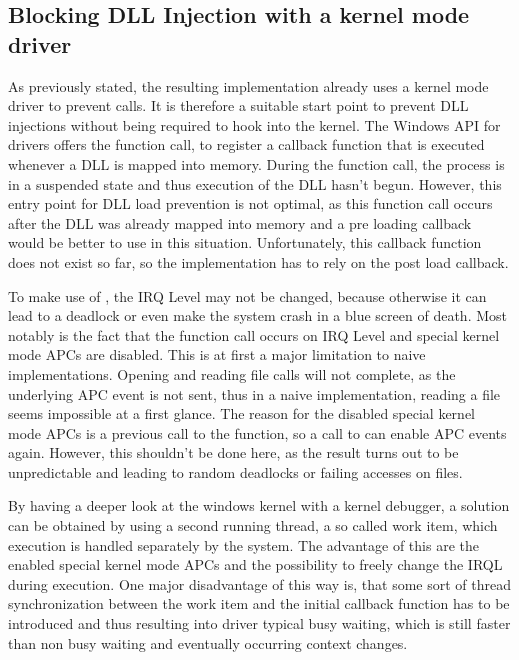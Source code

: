 \subsection{Blocking DLL Injection with a kernel mode driver}
As previously stated, the resulting implementation already uses a kernel mode driver to prevent  calls. It is therefore a suitable start point to prevent DLL injections without being required to hook into the kernel. The Windows API for drivers offers the  function call, to register a callback function that is executed whenever a DLL is mapped into memory. During the function call, the process is in a suspended state and thus execution of the DLL hasn't begun. However, this entry point for DLL load prevention is not optimal, as this function call occurs after the DLL was already mapped into memory and a pre loading callback would be better to use in this situation. Unfortunately, this callback function does not exist so far, so the implementation has to rely on the post load callback.

To make use of , the IRQ Level may not be changed, because otherwise it can lead to a deadlock or even make the system crash in a blue screen of death. Most notably is the fact that the function call occurs on IRQ Level  and special kernel mode APCs are disabled. This is at first a major limitation to naive implementations. Opening and reading file calls will not complete, as the underlying APC event is not sent, thus in a naive implementation, reading a file seems impossible at a first glance. The reason for the disabled special kernel mode APCs is a previous call to the  function, so a call to  can enable APC events again. However, this shouldn't be done here, as the result turns out to be unpredictable and leading to random deadlocks or failing accesses on files.

By having a deeper look at the windows kernel with a kernel debugger, a solution can be obtained by using a second running thread, a so called work item, which execution is handled separately by the system. The advantage of this are the enabled special kernel mode APCs and the possibility to freely change the IRQL during execution. One major disadvantage of this way is, that some sort of thread synchronization between the work item and the initial callback function has to be introduced and thus resulting into driver typical busy waiting, which is still faster than non busy waiting and eventually occurring context changes. 

